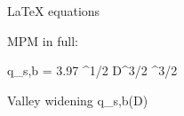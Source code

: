 LaTeX equations

MPM in full:

q_{s,b} = 3.97 \left[\frac{\rho_s - \rho}{\rho} g}\right]^{1/2} D^{3/2} ^{3/2}


Valley widening
 \propto {} \propto {} q_{s,b}(D)   
